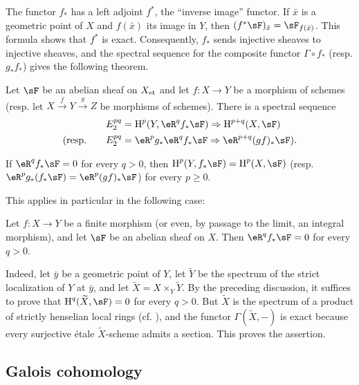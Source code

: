 The functor $f_*$ has a left adjoint $f^*$, the “inverse image” functor.
If $\bar x$ is a geometric point of $X$ and $f(\bar x)$ its image in
$Y$, then $(f^*\sF)_{\bar x}=\sF_{f(\bar x)}$. This formula shows that
$f^*$ is exact. Consequently, $f_*$ sends injective sheaves to injective
sheaves, and the spectral sequence for the composite functor
$\Gamma\circ f_*$ (resp. $g_*f_*$) gives the following theorem.

\begin{theorem}\label{I:2-3-4}
Let $\sF$ be an abelian sheaf on ${X}_{\textnormal{et}}$ and let $f:X\to Y$ be a
morphism of schemes (resp. let
$X\xrightarrow fY\xrightarrow gZ$ be morphisms of schemes). There is a
spectral sequence
\begin{align*}
  E_2^{pq} &= \h^p(Y,\eR^q f_* \sF) \Rightarrow \h^{p+q}(X,\sF) \\
  \text{(resp.}\qquad E_2^{pq} &= \eR^p g_* \eR^q f_* \sF \Rightarrow \eR^{p+q}(gf)_* \sF\text{).}
\end{align*}
\end{theorem}

\begin{corollary}\label{I:2-3-5}
If $\eR^qf_*\sF=0$ for every $q>0$, then
$\h^p(Y,f_*\sF)=\h^p(X,\sF)$ (resp.
$\eR^pg_*(f_*\sF)=\eR^p(gf)_*\sF$) for every $p\geqslant0$.
\end{corollary}

This applies in particular in the following case:

\begin{proposition}\label{I:2-3-6}
Let $f:X\to Y$ be a finite morphism (or even, by passage to the limit,
an integral morphism), and let $\sF$ be an abelian sheaf on $X$. Then
$\eR^qf_*\sF=0$ for every $q>0$.
\end{proposition}

Indeed, let $\bar y$ be a geometric point of $Y$, let $\widetilde Y$ be
the spectrum of the strict localization of $Y$ at $\bar y$, and let
$\widetilde X=X\times_Y\widetilde Y$. By the preceding discussion, it
suffices to prove that $\h^q(\widetilde X,\sF)=0$ for every $q>0$. But
$\widetilde X$ is the spectrum of a product of strictly henselian local
rings (cf. \cite[I]{ra70}), and the functor
$\Gamma(\widetilde X,-)$ is exact because every surjective étale
$\widetilde X$-scheme admits a section. This proves the assertion.

\subsection{Galois cohomology}\label{I:2-4}

